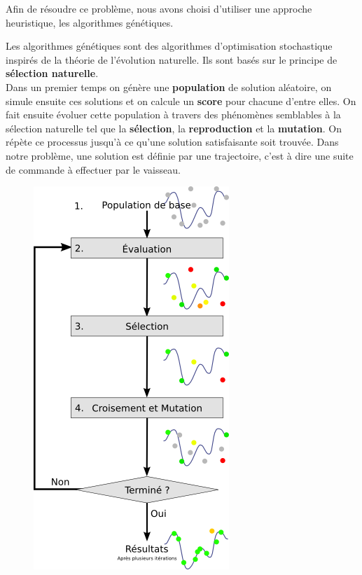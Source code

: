 \documentclass[french,a4paper,10pt,twocolumn]{article}
\begin{document}
Afin de résoudre ce problème, nous avons choisi d'utiliser une approche heuristique, les algorithmes génétiques.

Les algorithmes génétiques sont des algorithmes d'optimisation stochastique inspirés de la théorie de l'évolution naturelle.
Ils sont basés sur le principe de \textbf{sélection naturelle}.\\
Dans un premier temps on génère une \textbf{population} de solution aléatoire, on simule ensuite ces solutions et on calcule un \textbf{score} pour chacune d'entre elles.
On fait ensuite évoluer cette population à travers des phénomènes semblables à la sélection naturelle tel que la \textbf{sélection}, la \textbf{reproduction} et la \textbf{mutation}.
On répète ce processus jusqu'à ce qu'une solution satisfaisante soit trouvée.
Dans notre problème, une solution est définie par une trajectoire, c'est à dire une suite de commande à effectuer par le vaisseau.\\

\begin{figure}[H]
    \centering
    \includegraphics[scale=0.5]{images/schema_simple_algorithme_genetique.png}
    \caption{\cite[Schéma du fonctionnement de l'algorithme génétique]{schema_genetic_algorithm_image}}\label{fig:genetic_algorithm}
\end{figure}
\end{document}
